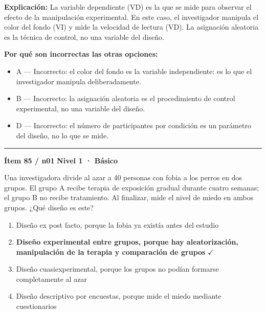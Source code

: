 \documentclass[12pt,a4paper]{article}
\begin{document}
\noindent\textbf{\color{azul}Explicación:} La variable dependiente (VD) es la que se mide para observar el efecto de la manipulación experimental. En este caso, el investigador manipula el color del fondo (VI) y mide la velocidad de lectura (VD). La asignación aleatoria es la técnica de control, no una variable del diseño.

\noindent\textbf{\color{gris}Por qué son incorrectas las otras opciones:}
\begin{itemize}
  \item {\small A — Incorrecto: el color del fondo es la variable independiente: es lo que el investigador manipula deliberadamente.}
  \item {\small B — Incorrecto: la asignación aleatoria es el procedimiento de control experimental, no una variable del diseño.}
  \item {\small D — Incorrecto: el número de participantes por condición es un parámetro del diseño, no lo que se mide.}
\end{itemize}
\vspace{8pt}\hrule\vspace{10pt}

\begin{mdframed}[backgroundcolor=fondogris,linecolor=azul,linewidth=1pt,innerleftmargin=10pt,innerrightmargin=10pt,innertopmargin=7pt,innerbottommargin=7pt]
\textbf{Ítem 85 / n01} \hfill {\small\bfseries\color{azul} Nivel 1 · Básico}
\end{mdframed}

Una investigadora divide al azar a 40 personas con fobia a los perros en dos grupos. El grupo A recibe terapia de exposición gradual durante cuatro semanas; el grupo B no recibe tratamiento. Al finalizar, mide el nivel de miedo en ambos grupos. ¿Qué diseño es este?

\begin{enumerate}
  \item[A.] Diseño ex post facto, porque la fobia ya existía antes del estudio
  \item[\textbf{\color{verde}B.}] \textbf{\color{verde} Diseño experimental entre grupos, porque hay aleatorización, manipulación de la terapia y comparación de grupos} \hfill $\checkmark$
  \item[C.] Diseño cuasiexperimental, porque los grupos no podían formarse completamente al azar
  \item[D.] Diseño descriptivo por encuestas, porque mide el miedo mediante cuestionarios
\end{enumerate}
\end{document}

